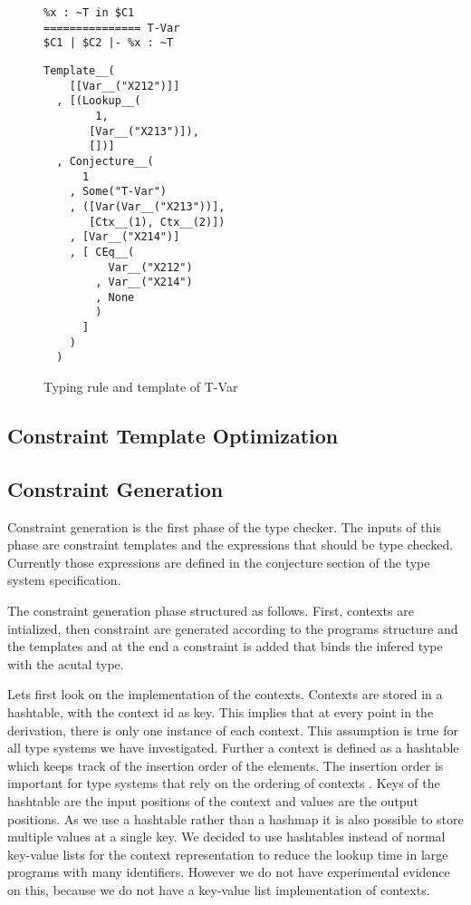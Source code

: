 \begin{figure}
  \centering
  \begin{minipage}{.45\linewidth}
\begin{verbatim}
%x : ~T in $C1
=============== T-Var
$C1 | $C2 |- %x : ~T
\end{verbatim}
  \end{minipage}
  \begin{minipage}{.45\linewidth}
\begin{verbatim}
Template__(
    [[Var__("X212")]]
  , [(Lookup__(
        1,
       [Var__("X213")]),
       [])]
  , Conjecture__(
      1
    , Some("T-Var")
    , ([Var(Var__("X213"))],
       [Ctx__(1), Ctx__(2)])
    , [Var__("X214")]
    , [ CEq__(
          Var__("X212")
        , Var__("X214")
        , None
        )
      ]
    )
  )
\end{verbatim}
  \end{minipage}
  \caption{Typing rule and template of T-Var}
  \label{fig:template-example}
\end{figure}
\subsection{Constraint Template Optimization}
\label{sec:constr-templ-optim}
\subsection{Constraint Generation}
\label{sec:constr-gener}
Constraint generation is the first phase of the type checker. The
inputs of this phase are constraint templates and the expressions that
should be type checked. Currently those expressions are defined in the
conjecture section of the type system specification. 

The constraint generation phase structured as follows. First, contexts
are intialized, then constraint are generated according to the
programs structure and the templates and at the end a constraint is
added that binds the infered type with the acutal type.

Lets first look on the implementation of the contexts. Contexts are
stored in a hashtable, with the context id as key. This implies that
at every point in the derivation, there is only one instance of each
context. This assumption is true for all type systems we have
investigated. Further a context is defined as a hashtable which keeps
track of the insertion order of the elements. The insertion order is
important for type systems that rely on the ordering of contexts
. Keys of the hashtable are the input positions of the
context and values are the output positions. As we use a hashtable
rather than a hashmap it is also possible to store multiple values at
a single key. We decided to use hashtables instead of normal key-value
lists for the context representation to reduce the lookup time in
large programs with many identifiers. However we do not have
experimental evidence on this, because we do not have a key-value list
implementation of contexts.

